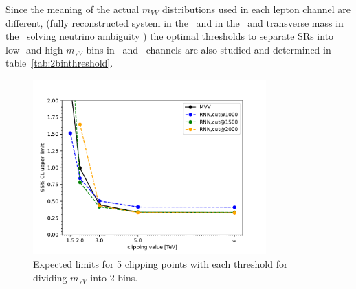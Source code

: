 Since the meaning of the actual $m_{VV}$ distributions used in each lepton channel are different,
(fully reconstructed system in the \tlep\ and in the \olep\, and transverse mass in the \zlep\ solving neutrino ambiguity )
the optimal thresholds to separate SRs into low- and high-$m_{VV}$ bins in \olep\ and \zlep\ channels are also studied and  determined in table~\ref{tab:2binthreshold}.
\begin{figure}[h]
        \centering
    	\includegraphics[width=0.80\textwidth]{figures/aQGC/ClippedFT02bin.pdf}
        \caption{Expected limits for 5 clipping points with each threshold for dividing $m_{VV}$ into 2 bins.}
        \label{fig:ThresholdScan}
\end{figure}

